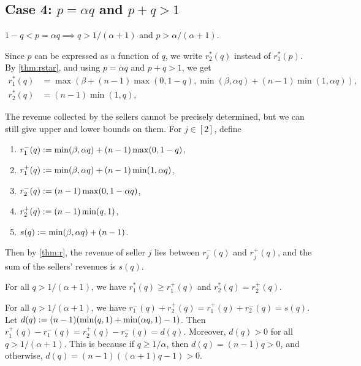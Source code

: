 \subsection{\texorpdfstring{\boldmath}{}Case 4:
    \texorpdfstring{$p = \alpha q$}{p = aq}
    and \texorpdfstring{$p + q > 1$}{p + q > 1}}
\label{sec:case4}

\begin{observation}
$1-q < p = \alpha q \implies q > 1/(\alpha+1)$ and $p > \alpha/(\alpha+1)$.
\end{observation}

Since $p$ can be expressed as a function of $q$, we write $r_2^*(q)$ instead of $r_1^*(p)$.
By \cref{thm:rstar}, and using $p = \alpha q$ and $p + q > 1$, we get
\begin{align*}
r_1^*(q) &= \max\left(\beta + (n-1)\max(0, 1-q),
    \min(\beta, \alpha q) + (n-1)\min(1, \alpha q)\right),
\\ r_2^*(q) &= (n-1)\min(1, q),
\end{align*}

The revenue collected by the sellers cannot be precisely determined,
but we can still give upper and lower bounds on them.
For $j \in [2]$, define
\begin{enumerate}
\item $r_1^-(q) := \min(\beta, \alpha q) + (n-1)\max(0, 1-q)$,
\item $r_1^+(q) := \min(\beta, \alpha q) + (n-1)\min(1, \alpha q)$,
\item $r_2^-(q) := (n-1)\max(0, 1-\alpha q)$,
\item $r_2^+(q) := (n-1)\min(q, 1)$,
\item $s(q) := \min(\beta, \alpha q) + (n-1)$.
\end{enumerate}
Then by \cref{thm:r}, the revenue of seller $j$ lies between
$r_j^-(q)$ and $r_j^+(q)$, and the sum of the sellers' revenues is $s(q)$.

\begin{observation}
For all $q > 1/(\alpha+1)$, we have $r_1^*(q) \ge r_1^+(q)$ and $r_2^*(q) = r_2^+(q)$.
\end{observation}

\begin{observation}
For all $q > 1/(\alpha+1)$, we have
$r_1^-(q) + r_2^+(q) = r_1^+(q) + r_2^-(q) = s(q)$.
Let $d(q) := (n-1)(\min(q, 1) + \min(\alpha q, 1) - 1)$.
Then $r_1^+(q) - r_1^-(q) = r_2^+(q) - r_2^-(q) = d(q)$.
Moreover, $d(q) > 0$ for all $q > 1/(\alpha+1)$.
This is because if $q \ge 1/\alpha$, then $d(q) = (n-1)q > 0$,
and otherwise, $d(q) = (n-1)((\alpha+1)q - 1) > 0$.
\end{observation}

